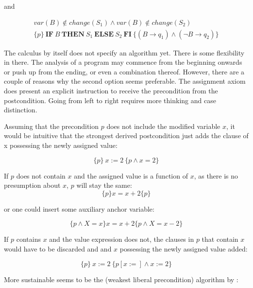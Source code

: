 and

\begin{equation}
\begin{gathered}
	var(B)\notin change(S_1)\land var(B)\notin change(S_2) \\
	\hline
	\{p\}\ \mathbf{IF}\ B\ \mathbf{THEN}\ S_1\ \mathbf{ELSE}\ S_2\ \mathbf{FI}\ \{(B\to q_1)\land (\lnot B \to q_2)\}
\end{gathered}
\end{equation}

The  calculus by itself does not specify an algorithm yet. There is some flexibility in there. The analysis of a program may commence from the beginning onwards or push up from the ending, or even a combination thereof. However, there are a couple of reasons why the second option seems preferable. The assignment axiom does present an explicit instruction to receive the precondition from the postcondition. Going from left to right requires more thinking and case distinction.

Assuming that the precondition $p$ does not include the modified variable $x$, it would be intuitive that the strongest derived postcondition just adds the clause of x possessing the newly assigned value:

\begin{equation}
\{p\}\ x:=2\ \{p\wedge x=2\}
\end{equation}

If $p$ does not contain $x$ and the assigned value is a function of $x$, as there is no presumption about $x$, $p$ will stay the same:
\begin{equation}
\{p\} x=x+2 \{p\}
\end{equation}

or one could insert some auxiliary anchor variable:

\begin{equation}
\{p\wedge X=x\} x=x+2 \{p\wedge X=x-2\}
\end{equation}

If $p$ contains $x$ and the value expression does not, the clauses in $p$ that contain $x$ would have to be discarded and and $x$ possessing the newly assigned value added:

\begin{equation}
\{p\}\ x:=2\ \{p[x:=]\wedge x:=2\}
\end{equation}

More sustainable seems to be the  (weakest liberal precondition) algorithm by :


